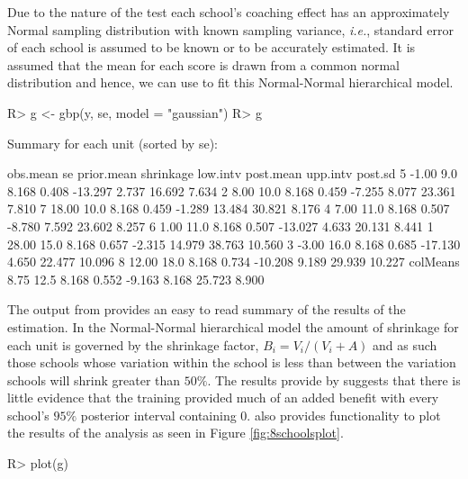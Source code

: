 \documentclass[article]{jss}
\begin{document}
Due to the nature of the test each school's coaching effect has an approximately Normal sampling distribution with known sampling variance, \emph{i.e.}, standard error of each school is assumed to be known or to be accurately estimated. It is assumed that the mean for each score is drawn from a common normal distribution and hence, we can use  to fit this Normal-Normal hierarchical model.


\begin{CodeChunk}
\begin{CodeInput}
R> g <- gbp(y, se, model = "gaussian")
R> g
\end{CodeInput}
\begin{CodeOutput}
Summary for each unit (sorted by se):

         obs.mean   se prior.mean shrinkage low.intv post.mean upp.intv post.sd
5           -1.00  9.0      8.168     0.408  -13.297     2.737   16.692   7.634
2            8.00 10.0      8.168     0.459   -7.255     8.077   23.361   7.810
7           18.00 10.0      8.168     0.459   -1.289    13.484   30.821   8.176
4            7.00 11.0      8.168     0.507   -8.780     7.592   23.602   8.257
6            1.00 11.0      8.168     0.507  -13.027     4.633   20.131   8.441
1           28.00 15.0      8.168     0.657   -2.315    14.979   38.763  10.560
3           -3.00 16.0      8.168     0.685  -17.130     4.650   22.477  10.096
8           12.00 18.0      8.168     0.734  -10.208     9.189   29.939  10.227
colMeans     8.75 12.5      8.168     0.552   -9.163     8.168   25.723   8.900
\end{CodeOutput}
\end{CodeChunk}
The output from  provides an easy to read summary of the results of the estimation. In the Normal-Normal hierarchical model the amount of shrinkage for each unit is governed by the shrinkage factor, $B_i = V_i/(V_i + A)$ and as such those schools whose variation within the school is less than between the variation schools will shrink greater than $50\%$. The results provide by  suggests that there is little evidence that the training provided much of an added benefit with every school's $95\%$ posterior interval containing 0.  also provides functionality to plot the results of the analysis as seen in Figure \ref{fig:8schoolsplot}.

\begin{CodeChunk}
\begin{CodeInput}
R> plot(g)
\end{CodeInput}
\end{CodeChunk}
\end{document}

